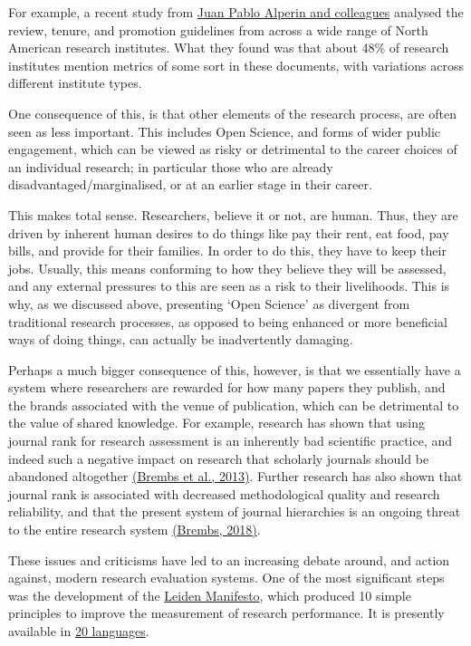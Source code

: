 \documentclass[]{book}
\begin{document}
For example, a recent study from \href{https://hcommons.org/deposits/item/hc:21015/}{Juan Pablo Alperin and colleagues} analysed the review, tenure, and promotion guidelines from across a wide range of North American research institutes. What they found was that about 48\% of research institutes mention metrics of some sort in these documents, with variations across different institute types.

One consequence of this, is that other elements of the research process, are often seen as less important. This includes Open Science, and forms of wider public engagement, which can be viewed as risky or detrimental to the career choices of an individual research; in particular those who are already disadvantaged/marginalised, or at an earlier stage in their career.

This makes total sense. Researchers, believe it or not, are human. Thus, they are driven by inherent human desires to do things like pay their rent, eat food, pay bills, and provide for their families. In order to do this, they have to keep their jobs. Usually, this means conforming to how they believe they will be assessed, and any external pressures to this are seen as a risk to their livelihoods. This is why, as we discussed above, presenting `Open Science' as divergent from traditional research processes, as opposed to being enhanced or more beneficial ways of doing things, can actually be inadvertently damaging.

Perhaps a much bigger consequence of this, however, is that we essentially have a system where researchers are rewarded for how many papers they publish, and the brands associated with the venue of publication, which can be detrimental to the value of shared knowledge. For example, research has shown that using journal rank for research assessment is an inherently bad scientific practice, and indeed such a negative impact on research that scholarly journals should be abandoned altogether \href{https://www.frontiersin.org/articles/10.3389/fnhum.2013.00291/full}{(Brembs et al., 2013)}. Further research has also shown that journal rank is associated with decreased methodological quality and research reliability, and that the present system of journal hierarchies is an ongoing threat to the entire research system \href{https://www.frontiersin.org/articles/10.3389/fnhum.2018.00037/full}{(Brembs, 2018)}.

These issues and criticisms have led to an increasing debate around, and action against, modern research evaluation systems. One of the most significant steps was the development of the \href{http://www.leidenmanifesto.org/}{Leiden Manifesto}, which produced 10 simple principles to improve the measurement of research performance. It is presently available in \href{http://www.leidenmanifesto.org/translations.html}{20 languages}.
\end{document}
